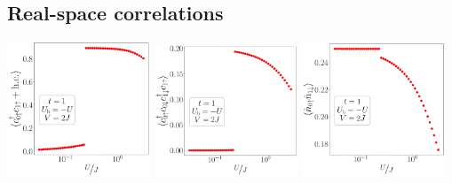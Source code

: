 \documentclass{report}
\numberwithin{equation}{section}
\begin{document}
\begin{center}
\end{center}

\subsection*{Real-space correlations}
\begin{center}
	\includegraphics[width=0.32\textwidth]{../figures/r1p-t=1.000,J=31.623,0.000,50,V=2J,Ubath=-U,N=4,U=0.032,3.162,50.pdf}
	\includegraphics[width=0.32\textwidth]{../figures/r-od-t=1.000,J=31.623,0.000,50,V=2J,Ubath=-U,N=4,U=0.032,3.162,50.pdf}
	\includegraphics[width=0.32\textwidth]{../figures/r-opp-t=1.000,J=31.623,0.000,50,V=2J,Ubath=-U,N=4,U=0.032,3.162,50.pdf}


\end{center}
\end{document}
